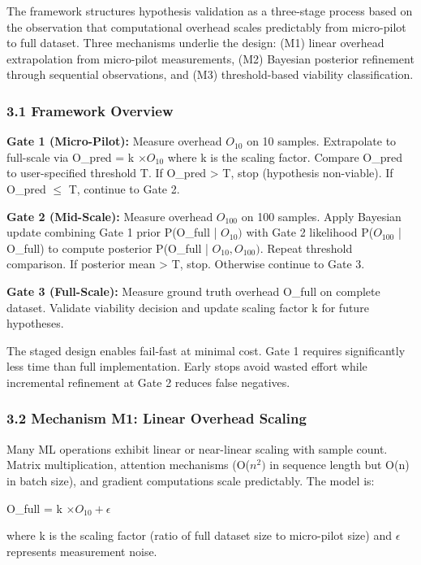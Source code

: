 
The framework structures hypothesis validation as a three-stage process based on the observation that computational overhead scales predictably from micro-pilot to full dataset. Three mechanisms underlie the design: (M1) linear overhead extrapolation from micro-pilot measurements, (M2) Bayesian posterior refinement through sequential observations, and (M3) threshold-based viability classification.

\subsubsection{3.1 Framework Overview}

\textbf{Gate 1 (Micro-Pilot):} Measure overhead $O_{10}$ on 10 samples. Extrapolate to full-scale via O\_pred = k $\times O_{10}$ where k is the scaling factor. Compare O\_pred to user-specified threshold T. If O\_pred > T, stop (hypothesis non-viable). If O\_pred $\leq$ T, continue to Gate 2.

\textbf{Gate 2 (Mid-Scale):} Measure overhead $O_{100}$ on 100 samples. Apply Bayesian update combining Gate 1 prior P(O\_full | $O_{10})$ with Gate 2 likelihood P($O_{100}$ | O\_full) to compute posterior P(O\_full | $O_{10}, O_{100})$. Repeat threshold comparison. If posterior mean > T, stop. Otherwise continue to Gate 3.

\textbf{Gate 3 (Full-Scale):} Measure ground truth overhead O\_full on complete dataset. Validate viability decision and update scaling factor k for future hypotheses.

The staged design enables fail-fast at minimal cost. Gate 1 requires significantly less time than full implementation. Early stops avoid wasted effort while incremental refinement at Gate 2 reduces false negatives.

\subsubsection{3.2 Mechanism M1: Linear Overhead Scaling}

Many ML operations exhibit linear or near-linear scaling with sample count. Matrix multiplication, attention mechanisms (O($n^{2})$ in sequence length but O(n) in batch size), and gradient computations scale predictably. The model is:

O\_full = k $\times O_{10} + \epsilon$

where k is the scaling factor (ratio of full dataset size to micro-pilot size) and $\epsilon$ represents measurement noise.

